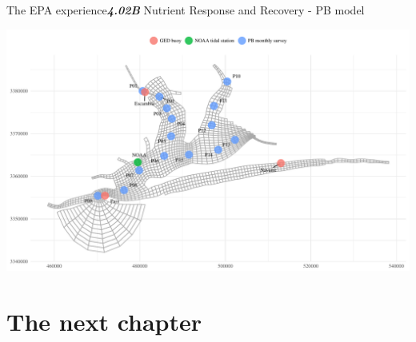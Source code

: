 \documentclass[serif]{beamer}\usepackage[]{graphicx}\usepackage[]{color}
\makeatletter
\def\maxwidth{ %
  \ifdim\Gin@nat@width>\linewidth
    \linewidth
  \else
    \Gin@nat@width
  \fi
}
\newcommand{\emtxt}[1]{\textbf{\textit{#1}}}
\makeatother
\begin{document}
\begin{frame}{The EPA experience}{\emtxt{4.02B} Nutrient Response and Recovery - PB model}


{\centering \includegraphics[width=\maxwidth]{fig/unnamed-chunk-6-1} 

}



\end{frame}

\section{The next chapter}
\end{document}
